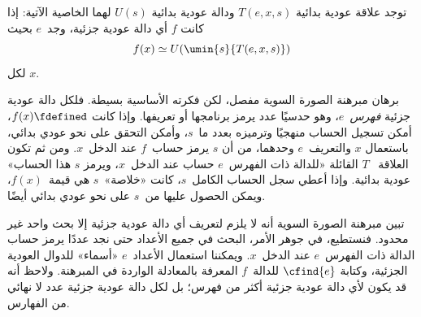 \documentclass[../../../include/open-logic-section]{subfiles}
\begin{document}

\begin{thm}
توجد علاقة عودية بدائية $T(e,x,s)$ ودالة عودية بدائية $U(s)$ لهما
الخاصية الآتية: إذا كانت $f$ أي دالة عودية جزئية، وجد~$e$ بحيث
\[
f(x) \simeq U(\umin{s}{T(e, x, s)})
\]
لكل $x$.
\end{thm}

\begin{explain}
برهان مبرهنة الصورة السوية مفصل، لكن فكرته الأساسية بسيطة. فلكل دالة
عودية جزئية \emph{فهرس}~$e$، وهو حدسيًا عدد يرمز برنامجها أو تعريفها.
وإذا كانت $f(x)\fdefined$، أمكن تسجيل الحساب منهجيًا وترميزه بعدد
ما~$s$، وأمكن التحقق على نحو عودي بدائي، باستعمال $x$ والتعريف~$e$
وحدهما، من أن $s$ يرمز حساب~$f$ عند الدخل~$x$. ومن ثم تكون العلاقة
~$T$ القائلة «للدالة ذات الفهرس~$e$ حساب عند الدخل~$x$، ويرمز $s$
هذا الحساب» عودية بدائية. وإذا أعطي سجل الحساب الكامل~$s$، كانت
«خلاصة»~$s$ هي قيمة~$f(x)$، ويمكن الحصول عليها من~$s$ على نحو عودي
بدائي أيضًا.

تبين مبرهنة الصورة السوية أنه لا يلزم لتعريف أي دالة عودية جزئية إلا
بحث واحد غير محدود. فنستطيع، في جوهر الأمر، البحث في جميع الأعداد حتى
نجد عددًا يرمز حساب الدالة ذات الفهرس~$e$ عند الدخل~$x$. ويمكننا
استعمال الأعداد~$e$ «أسماء» للدوال العودية الجزئية، وكتابة $\cfind{e}$
للدالة~$f$ المعرفة بالمعادلة الواردة في المبرهنة. ولاحظ أنه قد يكون
لأي دالة عودية جزئية أكثر من فهرس؛ بل لكل دالة عودية جزئية عدد لا
نهائي من الفهارس.
\end{explain}
\end{document}
